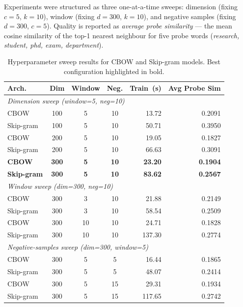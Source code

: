 \documentclass[12pt,a4paper]{article}
\begin{document}
Experiments were structured as three one-at-a-time sweeps: dimension (fixing
$c=5$, $k=10$), window (fixing $d=300$, $k=10$), and negative samples (fixing
$d=300$, $c=5$). Quality is reported as \emph{average probe similarity} ---
the mean cosine similarity of the top-1 nearest neighbour for five probe
words (\textit{research, student, phd, exam, department}).

\begin{table}[H]
    \centering
    \caption{Hyperparameter sweep results for CBOW and Skip-gram models.
             Best configuration highlighted in bold.}
    \label{tab:sweep}
    \small
    \begin{tabular}{lcccrr}
        \toprule
        \textbf{Arch.} & \textbf{Dim} & \textbf{Window} & \textbf{Neg.} &
        \textbf{Train~(s)} & \textbf{Avg Probe Sim} \\
        \midrule
        \multicolumn{6}{l}{\textit{Dimension sweep (window=5, neg=10)}} \\
        CBOW      & 100 & 5 & 10 &  13.72 & 0.2091 \\
        Skip-gram & 100 & 5 & 10 &  50.71 & 0.3950 \\
        CBOW      & 200 & 5 & 10 &  19.05 & 0.1827 \\
        Skip-gram & 200 & 5 & 10 &  66.63 & 0.3091 \\
        \textbf{CBOW}      & \textbf{300} & \textbf{5} & \textbf{10} &  \textbf{23.20} & \textbf{0.1904} \\
        \textbf{Skip-gram} & \textbf{300} & \textbf{5} & \textbf{10} &  \textbf{83.62} & \textbf{0.2567} \\
        \midrule
        \multicolumn{6}{l}{\textit{Window sweep (dim=300, neg=10)}} \\
        CBOW      & 300 &  3 & 10 &  21.88 & 0.2149 \\
        Skip-gram & 300 &  3 & 10 &  58.54 & 0.2509 \\
        CBOW      & 300 & 10 & 10 &  24.71 & 0.1828 \\
        Skip-gram & 300 & 10 & 10 & 137.30 & 0.2774 \\
        \midrule
        \multicolumn{6}{l}{\textit{Negative-samples sweep (dim=300, window=5)}} \\
        CBOW      & 300 & 5 &  5 &  16.44 & 0.1865 \\
        Skip-gram & 300 & 5 &  5 &  48.07 & 0.2414 \\
        CBOW      & 300 & 5 & 15 &  29.31 & 0.1934 \\
        Skip-gram & 300 & 5 & 15 & 117.65 & 0.2742 \\
        \bottomrule
    \end{tabular}
\end{table}
\end{document}
